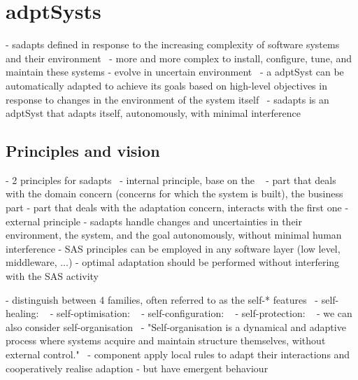 \section[Adaptive systems]{\Glspl{adptSyst}}
\label{sec:back:adapt-syst}

- \glspl{sadapt} defined in response to the increasing complexity of software systems and their environment~\cite{computing2006architectural, DBLP:journals/computer/KephartC03}
	- more and more complex to install, configure, tune, and maintain these systems
	- evolve in uncertain environment~\cite{DBLP:conf/dagstuhl/EsfahaniM10}
- a \gls{adptSyst} can be automatically adapted to achieve its goals based on high-level objectives in response to changes in the environment of the system itself~\cite{DBLP:conf/dagstuhl/ChengLGIMABBBCSDFGGGKKKLMMMPSTTWW09}
- \glspl{sadapt} is an \gls{adptSyst} that adapts itself, autonomously, with minimal interference~\cite{DBLP:conf/dagstuhl/BrunSGGKLMPS09}


\subsection{Principles and vision}

- 2 principles for \glspl{sadapt}~\cite{DBLP:books/sp/19/Weyns19}
	- internal principle, base on the ~\cite{DBLP:conf/icse/AnderssonLMW09}
		- part that deals with the domain concern (concerns for which the system is built), the business part
		- part that deals with the adaptation concern, interacts with the first one
	- external principle
		- \glspl{sadapt} handle changes and uncertainties in their environment, the system, and the goal autonomously, without minimal human interference	
- SAS principles can be employed in any software layer (low level, middleware, ...)
- optimal adaptation should be performed without interfering with the SAS activity~\cite{DBLP:journals/tse/KramerM90}

- distinguish between 4 families, often referred to as the self-* features~\cite{computing2006architectural}
	- self-healing: ~\cite{computing2006architectural}
	- self-optimisation: ~\cite{computing2006architectural}
	- self-configuration: ~\cite{computing2006architectural}
	- self-protection: ~\cite{computing2006architectural}
- we can also consider self-organisation~\cite{dempster1998self}
	- "Self-organisation is a dynamical and adaptive process where systems acquire and maintain structure themselves, without external control."~\cite{DBLP:conf/atal/WolfH04}
	- component apply local rules to adapt their interactions and cooperatively realise adaption
	- but have emergent behaviour
	
